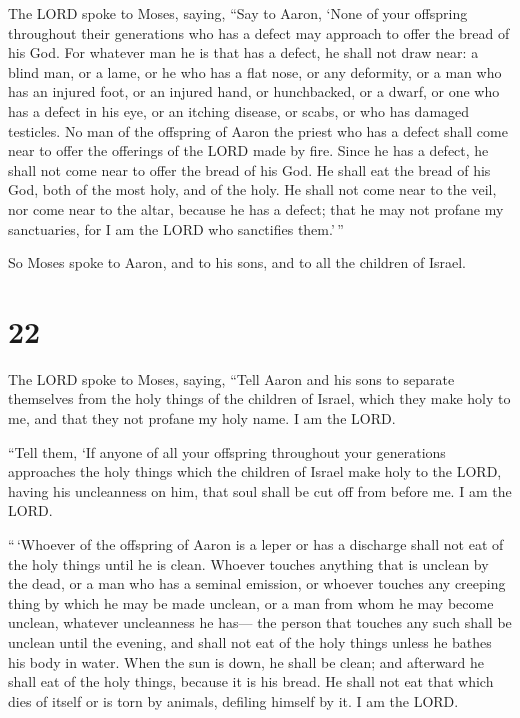 The LORD spoke to Moses, saying,  ``Say to
Aaron, `None of your offspring throughout their generations who has a
defect may approach to offer the bread of his God.  For
whatever man he is that has a defect, he shall not draw near: a blind
man, or a lame, or he who has a flat nose, or any deformity,
 or a man who has an injured foot, or an injured hand,
 or hunchbacked, or a dwarf, or one who has a defect in his
eye, or an itching disease, or scabs, or who has damaged testicles.
 No man of the offspring of Aaron the priest who has a
defect shall come near to offer the offerings of the LORD made by fire.
Since he has a defect, he shall not come near to offer the bread of his
God.  He shall eat the bread of his God, both of the most
holy, and of the holy.  He shall not come near to the veil,
nor come near to the altar, because he has a defect; that he may not
profane my sanctuaries, for I am the LORD who sanctifies them.'\,''

 So Moses spoke to Aaron, and to his sons, and to all the
children of Israel.

\hypertarget{section-21}{%
\section{22}\label{section-21}}

 The LORD spoke to Moses, saying,  ``Tell Aaron
and his sons to separate themselves from the holy things of the children
of Israel, which they make holy to me, and that they not profane my holy
name. I am the LORD.

 ``Tell them, `If anyone of all your offspring throughout
your generations approaches the holy things which the children of Israel
make holy to the LORD, having his uncleanness on him, that soul shall be
cut off from before me. I am the LORD.

 ``\,`Whoever of the offspring of Aaron is a leper or has a
discharge shall not eat of the holy things until he is clean. Whoever
touches anything that is unclean by the dead, or a man who has a seminal
emission,  or whoever touches any creeping thing by which he
may be made unclean, or a man from whom he may become unclean, whatever
uncleanness he has---  the person that touches any such
shall be unclean until the evening, and shall not eat of the holy things
unless he bathes his body in water.  When the sun is down,
he shall be clean; and afterward he shall eat of the holy things,
because it is his bread.  He shall not eat that which dies
of itself or is torn by animals, defiling himself by it. I am the LORD.

